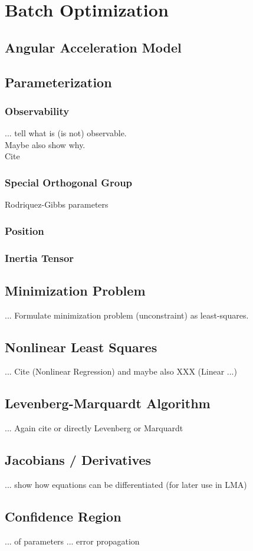 \chapter{Batch Optimization}
\label{chap:batch}

\section{Angular Acceleration Model}

\section{Parameterization}
\subsection{Observability}
... tell what is (is not) observable. \\ Maybe also show why. \\ Cite \cite{hermann1977}

\subsection{Special Orthogonal Group}
Rodriquez-Gibbs parameters

\subsection{Position}

\subsection{Inertia Tensor}

\section{Minimization Problem}
... Formulate minimization problem (unconstraint) as least-squares.

\section{Nonlinear Least Squares}
... Cite \cite{Seber} (Nonlinear Regression) and maybe also XXX (Linear ...)

\section{Levenberg-Marquardt Algorithm}
... Again cite \cite{Seber} or directly Levenberg or Marquardt

\section{Jacobians / Derivatives}
... show how equations can be differentiated (for later use in LMA)

\section{Confidence Region}
... of parameters
... error propagation
